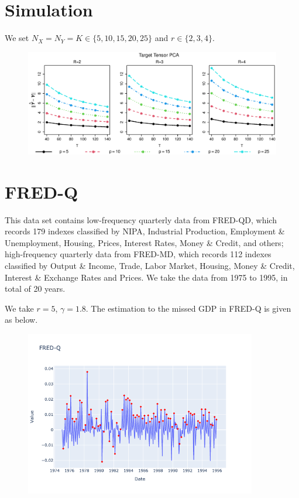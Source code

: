\documentclass[12pt]{article}
\numberwithin{equation}{section}
\begin{document}
\section{Simulation}
We set $N_X=N_Y=K\in\{5,10,15,20,25\}$ and $r\in\{2,3,4\}$. 
\begin{figure}[hbt]
  \includegraphics[width=\textwidth]{plot1.eps}
\end{figure}



\section{FRED-Q}
This data set contains low-frequency quarterly data from FRED-QD, which records 179 indexes classified by NIPA, Industrial Production, Employment \& Unemployment, Housing, Prices, Interest Rates, Money \& Credit, and others; high-frequency quarterly data from FRED-MD, which records 112 indexes classified by Output \& Income, Trade, Labor Market, Housing, Money \& Credit, Interest \& Exchange Rates and Prices. We take the data from 1975 to 1995, in total of 20 years.

We take $r=5$, $\gamma = 1.8$. The estimation to the missed GDP in FRED-Q is given as below.
\begin{figure}[hbt]
  \centering
  \includegraphics[width=0.9\textwidth]{TTPCAr5.png}
\end{figure}
\end{document}
